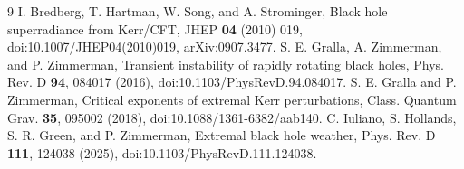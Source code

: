 \documentclass[aps,prd,twocolumn,10pt,nofootinbib,superscriptaddress,floatfix]{revtex4-2}
\begin{document}
\begin{thebibliography}{9}
 I. Bredberg, T. Hartman, W. Song, and A. Strominger,
Black hole superradiance from Kerr/CFT, JHEP \textbf{04} (2010) 019,
doi:10.1007/JHEP04(2010)019, arXiv:0907.3477.
 S. E. Gralla, A. Zimmerman, and P. Zimmerman,
Transient instability of rapidly rotating black holes,
Phys. Rev. D \textbf{94}, 084017 (2016), doi:10.1103/PhysRevD.94.084017.
 S. E. Gralla and P. Zimmerman,
Critical exponents of extremal Kerr perturbations,
Class. Quantum Grav. \textbf{35}, 095002 (2018), doi:10.1088/1361-6382/aab140.
 C. Iuliano, S. Hollands, S. R. Green, and P. Zimmerman,
Extremal black hole weather, Phys. Rev. D \textbf{111}, 124038 (2025),
doi:10.1103/PhysRevD.111.124038.
\end{thebibliography}
\end{document}
